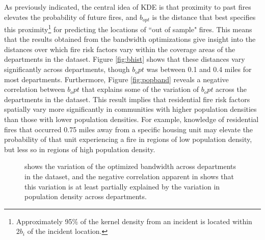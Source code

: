 \documentclass{svjour3}
\begin{document}
 As previously indicated, the central idea of KDE is that proximity to past fires elevates the probability of future fires, and $b_{opt}$ is the distance that best specifies this proximity\footnote{Approximately 95\% of the kernel density from an incident is located within $2b_i$ of the incident location.} for predicting the locations of ``out of sample" fires. This means that the results obtained from the bandwidth optimizations give insight into the distances over which fire risk factors vary within the coverage areas of the departments in the dataset. Figure \ref{fig:bhist} shows that these distances vary significantly across departments, though $b_opt$ was between 0.1 and 0.4 miles for most departments. Furthermore, Figure \ref{fig:popband} reveals a negative correlation between $b_opt$ that explains some of the variation of $b_opt$ across the departments in the dataset. This result implies that residential fire risk factors spatially vary more significantly in communities with higher population densities than those with lower population densities. For example, knowledge of residential fires that occurred 0.75 miles away from a specific housing unit may elevate the probability of that unit experiencing a fire in regions of low population density, but less so in regions of high population density.

\begin{figure}[!ht]
       \begin{center}
      \end{center}
      \caption{\protect{} shows the variation of the optimized bandwidth across departments in the dataset, and the negative correlation apparent in \protect{} shows that this variation is at least partially explained by the variation in population density across departments.}
     \label{fig:band_optimization}
  \end{figure}
  
\end{document}
